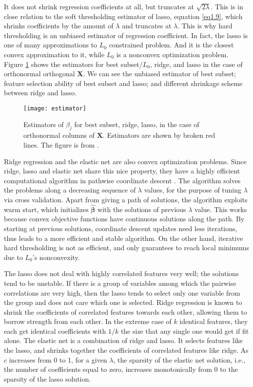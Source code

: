 It does not shrink regression coefficients at all, but truncates at $\sqrt{2\lambda}$. This is in close relation to the soft thresholding estimator of lasso, equation \eqref{eq1.9}, which shrinks coefficients by the amount of $\lambda$ and truncates at $\lambda$. This is why hard thresholding is an unbiased estimator of regression coefficient. In fact, the lasso is one of many approximations to $L_0$ constrained problem. And it is the closest convex approximation to it, while $L_0$ is a nonconvex optimization problem. Figure \ref{fig:estimators} shows the estimators for best subset/$L_0$, ridge, and lasso in the case of orthonormal orthogonal $\bm{X}$. We can see the unbiased estimator of best subset; feature selection ability of best subset and lasso; and different shrinkage scheme between ridge and lasso.
\begin{figure}[tbh]
  \centering
  \texttt{[image: estimator]}
  \caption[Estimators of $\beta_j$ in the case of orthonormal columns of $\bm{X}$]{
    Estimators of $\beta_j$ for best subset, ridge, lasso, in the case of orthonormal columns of $\bm{X}$. Estimators are shown by broken red lines. The figure is from \cite{hastie2009elements}.
  }
  \label{fig:estimators}
\end{figure}

Ridge regression and the elastic net are also convex optimization problems. Since ridge, lasso and elastic net share this nice property, they have a highly efficient computational algorithm in pathwise coordinate descent \citep{friedman2007pathwise}. The algorithm solves the problems along a decreasing sequence of $\lambda$ values, for the purpose of tuning $\lambda$ via cross validation. Apart from giving a path of solutions, the algorithm exploits warm start, which initializes $\hat{\bm{\beta}}$ with the solutions of previous $\lambda$ value. This works because convex objective functions have continuous solutions along the path. By starting at previous solutions, coordinate descent updates need less iterations, thus leads to a more efficient and stable algorithm. On the other hand, iterative hard thresholding is not as efficient, and only guarantees to reach local minimums due to $L_0$'s nonconvexity. 

The lasso does not deal with highly correlated features very well; the solutions tend to be unstable. If there is a group of variables among which the pairwise correlations are very high, then the lasso tends to select only one variable from the group and does not care which one is selected. Ridge regression is known to shrink the coeﬃcients of correlated features towards each other, allowing them to borrow strength from each other. In the extreme case of $k$ identical features, they each get identical coefficients with $1/k$ the size that any single one would get if fit alone. The elastic net is a combination of ridge and lasso. It selects features like the lasso, and shrinks together the coefficients of correlated features like ridge. As $c$ increases from 0 to 1, for a given $\lambda$, the sparsity of the elastic net solution, i.e., the number of coefficients equal to zero, increases monotonically from 0 to the sparsity of the lasso solution. 

